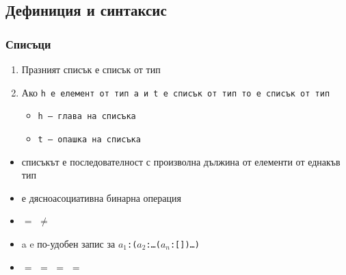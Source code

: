 \documentclass{beamer}
\begin{document}
\subsection{Дефиниция и синтаксис}


\begin{frame}
  \frametitle{Списъци}

  \begin{definition}
    \begin{enumerate}
    \item Празният списък \lst{[]} е списък от тип \lst{[a]}
    \item Ако \tt h е елемент от тип \tt a и \tt t е списък от тип \lst{[a]} то  е списък от тип \lst{[a]}
      \begin{itemize}
      \item \tt h --- глава на списъка
      \item \tt t --- опашка на списъка
      \end{itemize}
    \end{enumerate}
  \end{definition}
  \onslide<+->
  \begin{itemize}[<+->]
  \item списъкът е последователност с \alert{произволна дължина} от елементи от \alert{еднакъв тип}
  \item {}  е \alert{дясноасоциативна} бинарна операция
  \item {} $=$  $\neq$ 
  \item \hlist a e по-удобен запис за $a_1$\tt{:(}$a_2$\tt:\ldots($a_n$\tt{:[])}\ldots\tt)
  \item \lst{[1,2,3,4]} $=$  $=$  $=$  $=$ \
  \end{itemize}
\end{frame}
\end{document}
